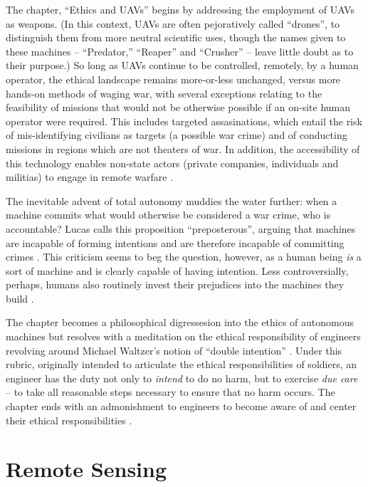 \documentclass[10pt]{article}
\begin{document}
The chapter, ``Ethics and UAVs'' \cite{Valavanis2015bz} begins by addressing the employment of UAVs as weapons. (In this context, UAVs are often pejoratively called ``drones'', to distinguish them from more neutral scientific uses, though the names given to these machines -- ``Predator,'' ``Reaper'' and ``Crusher'' \cite{Lucas2011} -- leave little doubt as to their purpose.) So long as UAVs continue to be controlled, remotely, by a human operator, the ethical landscape remains more-or-less unchanged, versus more hands-on methods of waging war, with several exceptions relating to the feasibility of missions that would not be otherwise possible if an on-site human operator were required. This includes targeted assasinations, which entail the risk of mis-identifying civilians as targets (a possible war crime) and of conducting missions in regions which are not theaters of war. In addition, the accessibility of this technology enables non-state actors (private companies, individuals and militias) to engage in remote warfare \cite[p.2867]{Valavanis2015bz}. 

The inevitable advent of total autonomy muddies the water further: when a machine commits what would otherwise be considered a war crime, who is accountable? Lucas calls this proposition ``preposterous'', arguing that machines are incapable of forming intentions and are therefore incapable of committing crimes \cite[p.2868]{Valavanis2015bz}. This criticism seems to beg the question, however, as a human being \emph{is} a sort of machine and is clearly capable of having intention. Less controversially, perhaps, humans also routinely invest their prejudices into the machines they build \cite{Greenwald1998,Caliskan2017}. 

The chapter becomes a philosophical digressesion into the ethics of autonomous machines but resolves with a meditation on the ethical responsibility of engineers \cite[p.2873]{Valavanis2015bz} revolving around Michael Waltzer's notion of ``double intention'' \cite{Waltzer}. Under this rubric, originally intended to articulate the ethical responsibilities of soldiers, an engineer has the duty not only to \emph{intend} to do no harm, but to exercise \emph{due care} \cite{Lucas2011} -- to take all reasonable steps necessary to ensure that no harm occurs. The chapter ends with an admonishment to engineers to become aware of and center their ethical responsibilities \cite[p.2974]{Valavanis2015bz}.

\section{Remote Sensing}
\end{document}
